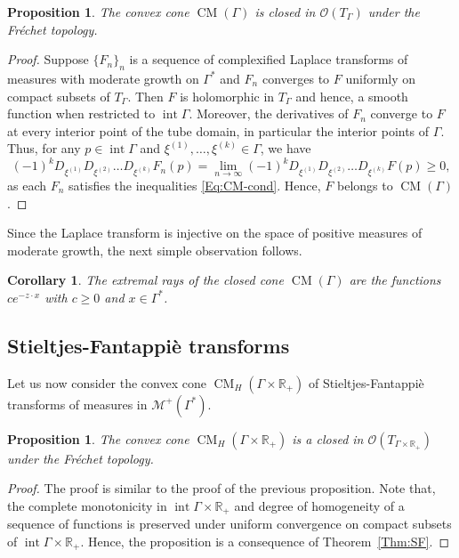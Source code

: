 \documentclass[11pt,reqno]{amsart}
\theoremstyle{plain}
\newtheorem{corollary}[theorem]{Corollary}
\newtheorem{proposition}[theorem]{Proposition}
\theoremstyle{definition}
\numberwithin{equation}{section}
\begin{document}
    \begin{proposition}
		The convex cone ${\operatorname{CM}(\Gamma)}$ is closed in $\mathcal{O}(T_\Gamma)$ under the Fr\'echet topology.
	\end{proposition}
	\begin{proof}
		Suppose $\{F_n\}_n$ is a sequence of complexified Laplace transforms of measures with moderate growth on $\Gamma^*$ and $F_n$ converges to $F$ uniformly on compact subsets of $T_\Gamma$. Then $F$ is holomorphic in $T_\Gamma$ and hence, a smooth function when restricted to $\operatorname{int} \Gamma$.
		Moreover, the derivatives of $F_n$ converge to $F$ at every interior point of the tube domain, in particular the interior points of $\Gamma$. Thus, for any $p\in \operatorname{int} \Gamma$ and $\xi^{(1)}, \dots, \xi^{(k)} \in \Gamma$, we have
		$$(-1)^k D_{\xi^{(1)}} D_{\xi^{(2)}} \dots D_{\xi^{(k)}} F_n(p) = \lim_{n\to \infty} (-1)^k D_{\xi^{(1)}} D_{\xi^{(2)}} \dots D_{\xi^{(k)}} F(p) \geq 0,$$ as each $F_n$ satisfies the inequalities \eqref{Eq:CM-cond}. Hence, $F$ belongs to ${\operatorname{CM}(\Gamma)}$.
        \end{proof}
        
  Since the Laplace transform is injective on the space of positive measures of moderate growth, the next simple observation follows.
  \begin{corollary} The extremal rays of the closed cone ${\operatorname{CM}(\Gamma)}$ are the functions $c e^{-z \cdot x}$ with $c \geq 0$ and $x \in \Gamma^\ast$.
   \end{corollary}
    
	\subsection{Stieltjes-Fantappi\`e transforms}
	Let us now consider the convex cone $\operatorname{CM}_H(\Gamma \times \mathbb{R}_+)$
     of Stieltjes-Fantappi\`e transforms of measures in $\mathcal{M}^+(\Gamma^*)$.
	\begin{proposition}
		The convex cone $\operatorname{CM}_H(\Gamma \times \mathbb{R}_+)$ is a closed in $\mathcal{O}(T_{\Gamma \times \mathbb{R}_+})$ under the Fr\'echet topology.
	\end{proposition}
	\begin{proof}
	The proof is similar to the proof of the previous proposition. Note that, the complete monotonicity in $\operatorname{int} \Gamma \times \mathbb{R}_+$ and degree of homogeneity of a sequence of functions is preserved under uniform convergence on compact subsets of $\operatorname{int} \Gamma \times \mathbb{R}_+$. Hence, the proposition is a consequence of Theorem~\ref{Thm:SF}.
	\end{proof}
	
\end{document}
